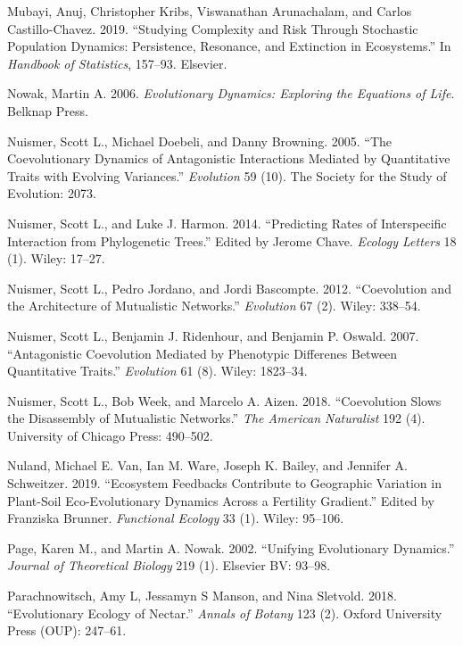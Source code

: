 \documentclass[]{article}
\begin{document}
\leavevmode\hypertarget{ref-Mubayi2019}{}%
Mubayi, Anuj, Christopher Kribs, Viswanathan Arunachalam, and Carlos
Castillo-Chavez. 2019. ``Studying Complexity and Risk Through Stochastic
Population Dynamics: Persistence, Resonance, and Extinction in
Ecosystems.'' In \emph{Handbook of Statistics}, 157--93. Elsevier.

\leavevmode\hypertarget{ref-9780674023383}{}%
Nowak, Martin A. 2006. \emph{Evolutionary Dynamics: Exploring the
Equations of Life}. Belknap Press.

\leavevmode\hypertarget{ref-Nuismer2005}{}%
Nuismer, Scott L., Michael Doebeli, and Danny Browning. 2005. ``The
Coevolutionary Dynamics of Antagonistic Interactions Mediated by
Quantitative Traits with Evolving Variances.'' \emph{Evolution} 59 (10).
The Society for the Study of Evolution: 2073.

\leavevmode\hypertarget{ref-Nuismer2014}{}%
Nuismer, Scott L., and Luke J. Harmon. 2014. ``Predicting Rates of
Interspecific Interaction from Phylogenetic Trees.'' Edited by Jerome
Chave. \emph{Ecology Letters} 18 (1). Wiley: 17--27.

\leavevmode\hypertarget{ref-Nuismer2012}{}%
Nuismer, Scott L., Pedro Jordano, and Jordi Bascompte. 2012.
``Coevolution and the Architecture of Mutualistic Networks.''
\emph{Evolution} 67 (2). Wiley: 338--54.

\leavevmode\hypertarget{ref-Nuismer2007}{}%
Nuismer, Scott L., Benjamin J. Ridenhour, and Benjamin P. Oswald. 2007.
``Antagonistic Coevolution Mediated by Phenotypic Differenes Between
Quantitative Traits.'' \emph{Evolution} 61 (8). Wiley: 1823--34.

\leavevmode\hypertarget{ref-Nuismer2018}{}%
Nuismer, Scott L., Bob Week, and Marcelo A. Aizen. 2018. ``Coevolution
Slows the Disassembly of Mutualistic Networks.'' \emph{The American
Naturalist} 192 (4). University of Chicago Press: 490--502.

\leavevmode\hypertarget{ref-VanNuland2019}{}%
Nuland, Michael E. Van, Ian M. Ware, Joseph K. Bailey, and Jennifer A.
Schweitzer. 2019. ``Ecosystem Feedbacks Contribute to Geographic
Variation in Plant-Soil Eco-Evolutionary Dynamics Across a Fertility
Gradient.'' Edited by Franziska Brunner. \emph{Functional Ecology} 33
(1). Wiley: 95--106.

\leavevmode\hypertarget{ref-PAGE2002}{}%
Page, Karen M., and Martin A. Nowak. 2002. ``Unifying Evolutionary
Dynamics.'' \emph{Journal of Theoretical Biology} 219 (1). Elsevier BV:
93--98.

\leavevmode\hypertarget{ref-Parachnowitsch2018}{}%
Parachnowitsch, Amy L, Jessamyn S Manson, and Nina Sletvold. 2018.
``Evolutionary Ecology of Nectar.'' \emph{Annals of Botany} 123 (2).
Oxford University Press (OUP): 247--61.
\end{document}
